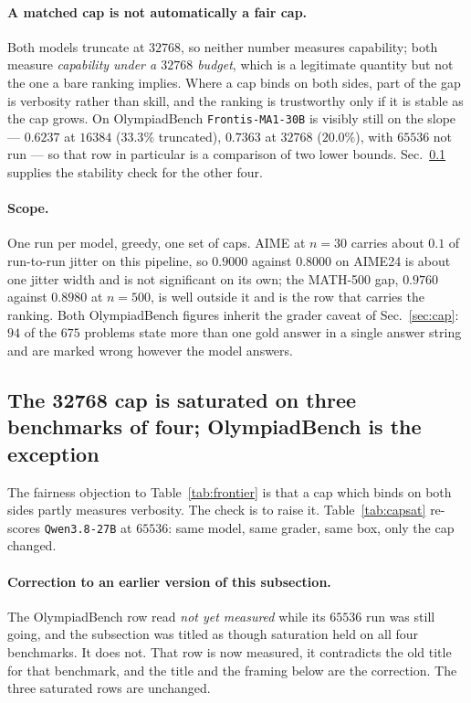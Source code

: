\paragraph{A matched cap is not automatically a fair cap.} Both models truncate at $32768$, so
neither number measures capability; both measure \emph{capability under a $32768$ budget},
which is a legitimate quantity but not the one a bare ranking implies. Where a cap binds on
both sides, part of the gap is verbosity rather than skill, and the ranking is trustworthy
only if it is stable as the cap grows. On OlympiadBench \texttt{Frontis-MA1-30B} is visibly
still on the slope --- $0.6237$ at $16384$ ($33.3\%$ truncated), $0.7363$ at $32768$
($20.0\%$), with $65536$ not run --- so that row in particular is a comparison of two lower
bounds. Sec.~\ref{sec:capsat} supplies the stability check for the other four.

\paragraph{Scope.} One run per model, greedy, one set of caps. AIME at $n=30$ carries about
$0.1$ of run-to-run jitter on this pipeline, so $0.9000$ against $0.8000$ on AIME24 is about
one jitter width and is not significant on its own; the MATH-500 gap, $0.9760$ against
$0.8980$ at $n=500$, is well outside it and is the row that carries the ranking. Both
OlympiadBench figures inherit the grader caveat of Sec.~\ref{sec:cap}: $94$ of the $675$
problems state more than one gold answer in a single answer string and are marked wrong
however the model answers.

\subsection{The 32768 cap is saturated on three benchmarks of four; OlympiadBench is the
exception}
\label{sec:capsat}

The fairness objection to Table~\ref{tab:frontier} is that a cap which binds on both sides
partly measures verbosity. The check is to raise it. Table~\ref{tab:capsat} re-scores
\texttt{Qwen3.8-27B} at $65536$: same model, same grader, same box, only the cap changed.

\paragraph{Correction to an earlier version of this subsection.} The OlympiadBench row read
\emph{not yet measured} while its $65536$ run was still going, and the subsection was titled
as though saturation held on all four benchmarks. It does not. That row is now measured, it
contradicts the old title for that benchmark, and the title and the framing below are the
correction. The three saturated rows are unchanged.

